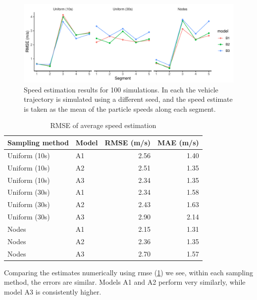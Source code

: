 \begin{knitrout}\small
{}\color{fgcolor}\begin{figure}
\includegraphics[width=\maxwidth]{figure/sim2_pf_full-1} \caption[Speed estimation results for 100 simulations]{Speed estimation results for 100 simulations. In each the vehicle trajectory is simulated using a different seed, and the speed estimate is taken as the mean of the particle speeds along each segment.}\label{fig:sim2_pf_full}
\end{figure}

\begin{table}

\caption{\label{tab:sim2_pf_full}RMSE of average speed estimation}
\centering
\begin{tabular}[t]{llrr}
\toprule
Sampling method & Model & RMSE (m/s) & MAE (m/s)\\
\midrule
Uniform (10s) & A1 & 2.56 & 1.40\\
Uniform (10s) & A2 & 2.51 & 1.35\\
Uniform (10s) & A3 & 2.34 & 1.35\\
\midrule
Uniform (30s) & A1 & 2.34 & 1.58\\
Uniform (30s) & A2 & 2.43 & 1.63\\
Uniform (30s) & A3 & 2.90 & 2.14\\
\midrule
Nodes & A1 & 2.15 & 1.31\\
Nodes & A2 & 2.36 & 1.35\\
Nodes & A3 & 2.70 & 1.57\\
\bottomrule
\end{tabular}
\end{table}


\end{knitrout}



Comparing the estimates numerically using \gls{rmse} (\cref{tab:sim2_pf_full}) we see, within each sampling method, the errors are similar. Models A1 and A2 perform very similarly, while model A3 is consistently higher.
